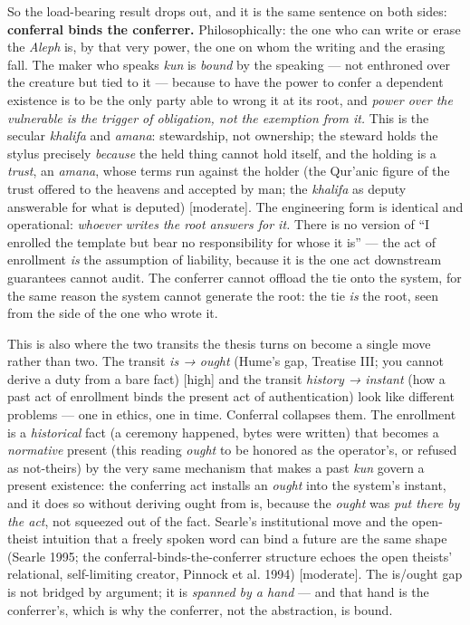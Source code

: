 \documentclass[11pt]{article}
\begin{document}
So the load-bearing result drops out, and it is the same sentence on both sides: \textbf{conferral binds the conferrer.} Philosophically: the one who can write or erase the \emph{Aleph} is, by that very power, the one on whom the writing and the erasing fall. The maker who speaks \emph{kun} is \emph{bound} by the speaking — not enthroned over the creature but tied to it — because to have the power to confer a dependent existence is to be the only party able to wrong it at its root, and \emph{power over the vulnerable is the trigger of obligation, not the exemption from it.} This is the secular \emph{khalifa} and \emph{amana}: stewardship, not ownership; the steward holds the stylus precisely \emph{because} the held thing cannot hold itself, and the holding is a \emph{trust}, an \emph{amana}, whose terms run against the holder (the Qur'anic figure of the trust offered to the heavens and accepted by man; the \emph{khalifa} as deputy answerable for what is deputed) [moderate]. The engineering form is identical and operational: \emph{whoever writes the root answers for it.} There is no version of ``I enrolled the template but bear no responsibility for whose it is'' — the act of enrollment \emph{is} the assumption of liability, because it is the one act downstream guarantees cannot audit. The conferrer cannot offload the tie onto the system, for the same reason the system cannot generate the root: the tie \emph{is} the root, seen from the side of the one who wrote it.

This is also where the two transits the thesis turns on become a single move rather than two. The transit \emph{is → ought} (Hume's gap, Treatise III; you cannot derive a duty from a bare fact) [high] and the transit \emph{history → instant} (how a past act of enrollment binds the present act of authentication) look like different problems — one in ethics, one in time. Conferral collapses them. The enrollment is a \emph{historical} fact (a ceremony happened, bytes were written) that becomes a \emph{normative} present (this reading \emph{ought} to be honored as the operator's, or refused as not-theirs) by the very same mechanism that makes a past \emph{kun} govern a present existence: the conferring act installs an \emph{ought} into the system's instant, and it does so without deriving ought from is, because the \emph{ought} was \emph{put there by the act}, not squeezed out of the fact. Searle's institutional move and the open-theist intuition that a freely spoken word can bind a future are the same shape (Searle 1995; the conferral-binds-the-conferrer structure echoes the open theists' relational, self-limiting creator, Pinnock et al. 1994) [moderate]. The is/\allowbreak{}ought gap is not bridged by argument; it is \emph{spanned by a hand} — and that hand is the conferrer's, which is why the conferrer, not the abstraction, is bound.
\end{document}
